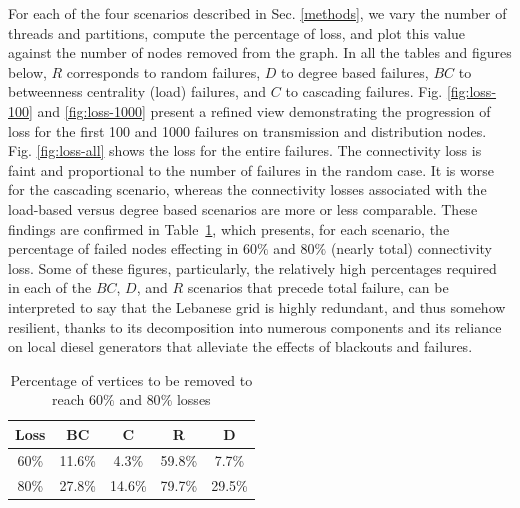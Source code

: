 For each of the four scenarios described in Sec. \ref{methods}, we vary the number of threads and partitions, compute the percentage of loss, and plot this value against the number of nodes removed from the graph. In all the tables and figures below, $R$ corresponds to random failures, $D$ to degree based failures, $BC$ to betweenness centrality (load) failures, and $C$ to cascading failures. Fig. \ref{fig:loss-100} and \ref{fig:loss-1000} present a refined view demonstrating the progression of loss for the first 100 and 1000 failures on transmission and distribution nodes. Fig. \ref{fig:loss-all} shows the loss for the entire failures. The connectivity loss is faint and proportional to the number of failures in the random case. It is worse for the cascading scenario, whereas the connectivity losses associated with the load-based versus degree based scenarios are more or less comparable. These findings are confirmed in Table~\ref{resilience}, which presents, for each scenario, the percentage of failed nodes effecting in $60\%$ and $80\%$ (nearly total) connectivity loss. Some of these figures, particularly, the relatively high percentages required in each of the $BC$, $D$, and $R$ scenarios that precede total failure, can be interpreted to say that the Lebanese grid is highly redundant, and thus somehow resilient, thanks to its decomposition into numerous components and its reliance on local diesel generators that alleviate the effects of blackouts and failures. 


\begin{table}[t]
\centering
\caption{Percentage of vertices to be removed to reach $60\%$ and $80\%$ losses}
\label{tab:threshold-percentage}
{\small
\begin{tabular}{||c||c|c|c|c||}
\hline
\textbf{Loss}	&\cellcolor{black!10}BC&	\cellcolor{black!10}C & \cellcolor{black!10} R & \cellcolor{black!10} D \\ \hline \hline
60\% &		11.6\%&	4.3\%	&59.8\%&	7.7\%	 \\ \hline		
80\%	&		27.8\%&	14.6\%	&79.7\%&	29.5\%	 \\ \hline		
\end{tabular}
}
\label{resilience}
\end{table}




